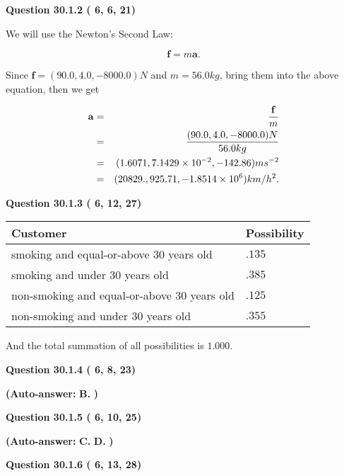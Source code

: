 \documentclass[12pt]{article}
\begin{document}
  
{\textbf{\large{Question
30.1.2 
 (          6,          6,         21)
}}}

We will use the Newton's Second Law:
 
\[
\mathbf{f}=m\mathbf{a}.
\]
 
Since $\mathbf{f}=( %
90.0,  %
4.0,  %
-8000.0 )N$
and $m= %
56.0 kg$, bring them into the above equation, then we get
 
\begin{eqnarray*}
\mathbf{a}&=&\frac{\mathbf{f}}m  \\
&=&\frac{(
90.0 ,
4.0 ,
-8000.0 )N
}{ %
56.0 kg}  \\
&=&(
1.6071 ,
7.1429 \times 10^{-2},
-142.86
)ms^{-2} \\
&=&(
20829. ,
925.71 ,
-1.8514 \times 10^{6}
)km/h^2.
\end{eqnarray*}
 
  
  
{\textbf{\large{Question
30.1.3 
 (          6,         12,         27)
}}}

 
\noindent
\begin{tabular}{|l|l|}
\hline
Customer & Possibility \\
\hline
smoking  and  %
equal-or-above 30 years old &
  $ %
.135$ \\
\hline
smoking  and  %
under 30 years old &
  $ %
.385$ \\
\hline
 non-smoking and  %
equal-or-above 30 years old &
  $ %
.125$ \\
\hline
 non-smoking and  %
under 30 years old &
  $ %
.355$ \\
\hline
\end{tabular}
 
\noindent
 And the total summation of all possibilities is $  %
1.000 $.
 
  
  
{\textbf{\large{Question
30.1.4 
 (          6,          8,         23)
}}}
 
 
{\textbf{(Auto-answer:}}
{\textbf{\large{
B.}}}
{\textbf{)}}
 
 
  
  
{\textbf{\large{Question
30.1.5 
 (          6,         10,         25)
}}}
 
 
{\textbf{(Auto-answer:}}
{\textbf{\large{
C.}}}
{\textbf{\large{
D.}}}
{\textbf{)}}
 
 
  
  
{\textbf{\large{Question
30.1.6 
 (          6,         13,         28)
}}}
\end{document}
